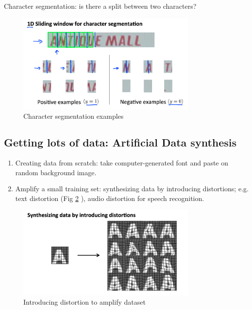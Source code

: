     Character segmentation: is there a split between two characters?
    \begin{figure}[htpb]
        \centering
        \includegraphics[width=0.8\textwidth]{image/character-segmentation.png}
        \caption{Character segmentation examples}
        \label{fig:character-segmentation}
    \end{figure}

\subsection{Getting lots of data: Artificial Data synthesis}
\begin{enumerate}
    \item Creating data from scratch: take computer-generated font and paste on random background image.
    \item Amplify a small training set: synthesizing data by introducing distortions; e.g. text distortion (Fig \ref{fig:text-detection-distortion} ), audio distortion for speech recognition.  
\end{enumerate}
    \begin{figure}[htpb]
        \centering
        \includegraphics[width=0.8\textwidth]{image/text-detection-distortion.png}
        \caption{Introducing distortion to amplify dataset}
        \label{fig:text-detection-distortion}
    \end{figure}



